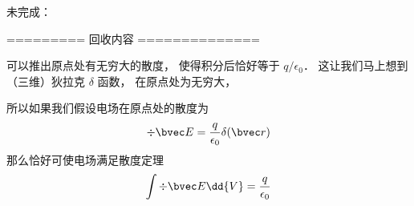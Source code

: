 未完成： 

========= 回收内容 ==============

可以推出原点处有无穷大的散度， 使得积分后恰好等于 $q/\epsilon_0$． 这让我们马上想到（三维）狄拉克 $\delta$ 函数， 在原点处为无穷大， 

所以如果我们假设电场在原点处的散度为
\begin{equation}
\div \bvec E = \frac{q}{\epsilon_0}\delta(\bvec r)
\end{equation}
那么恰好可使电场满足散度定理
\begin{equation}
\int \div \bvec E \dd{V} = \frac{q}{\epsilon_0}
\end{equation}
